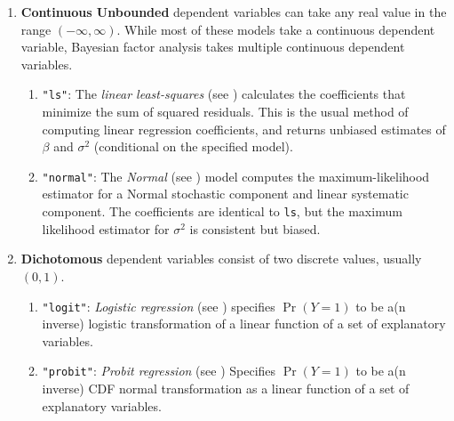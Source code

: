 \begin{enumerate}
\item {\bf Continuous Unbounded} dependent variables can take any
real value in the range $(-\infty, \infty)$. While most of these
models take a continuous dependent variable, Bayesian factor analysis takes multiple
continuous dependent variables.  

   \begin{enumerate}
   \item {\tt "ls"}: The {\it linear least-squares} (see )
     calculates the coefficients that minimize the sum of squared
     residuals.  This is the usual method of computing linear
     regression coefficients, and returns unbiased estimates of
     $\beta$ and $\sigma^2$ (conditional on the specified model).

   \item {\tt "normal"}: The {\it Normal} (see ) model
     computes the maximum-likelihood estimator for a Normal
     stochastic component and linear systematic component.  The
     coefficients are identical to \texttt{ls}, but the
     maximum likelihood estimator for $\sigma^2$ is consistent
     but biased.
   \end{enumerate}
 \item {\bf Dichotomous} dependent variables consist of two discrete
values, usually $(0,1)$.  
   \begin{enumerate}
   \item {\tt "logit"}: {\it Logistic regression} (see )
     specifies $\Pr(Y=1)$ to be a(n inverse) logistic transformation
     of a linear function of a set of explanatory variables.
   \item {\tt "probit"}: {\it Probit regression} (see )
     Specifies $\Pr(Y=1)$ to be a(n inverse) CDF normal transformation
     as a linear function of a set of explanatory variables.


\end{enumerate}
\end{enumerate}
